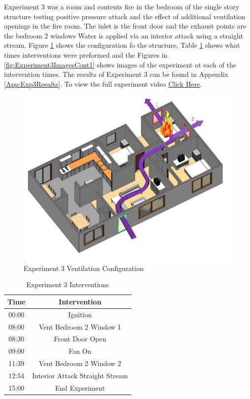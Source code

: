 \documentclass{article}
\begin{document}
Experiment 3 was a room and contents fire in the bedroom of the single story structure testing positive pressure attack and the effect of additional ventilation openings in the fire room. The inlet is the front door and the exhaust points are the bedroom 2 windows Water is applied via an interior attack using a straight stream. Figure \ref{fig:Exp3VentConfig} shows the configuration fo the structure, Table \ref{Table:Exp3Interventions} shows what times interventions were preformed and the Figures in \ref{fig:Experiment3ImagesCont1} shows images of the experiment at each of the intervention times. The results of Experiment 3 can be found in Appendix \ref{App:Exp3Results}. To view the full experiment video \href{https://youtu.be/fi9lZvUhMwE}{Click Here}.

\begin{figure}[H]
	\centering
	\includegraphics[width=5in]{0_Images/FireExperiments/Single_Story/Experiment_3.jpg}
	\caption{Experiment 3 Ventilation Configuration}
	\label{fig:Exp3VentConfig}
\end{figure}

\begin{table}[H]
	\centering
	\caption{Experiment 3 Interventions}
	\begin{tabular}{|c|c|} 
		\hline
		Time & Intervention \\ \hline \hline
		00:00 & Ignition \\ \hline
		08:00 & Vent Bedroom 2 Window 1 \\ \hline
		08:30 & Front Door Open \\ \hline
		09:00 & Fan On \\ \hline
		11:39 & Vent Bedroom 2 Window 2 \\ \hline
		12:54 & Interior Attack Straight Stream \\ \hline
		15:00 & End Experiment \\ \hline
	\end{tabular}
	\label{Table:Exp3Interventions}
\end{table}
\end{document}
